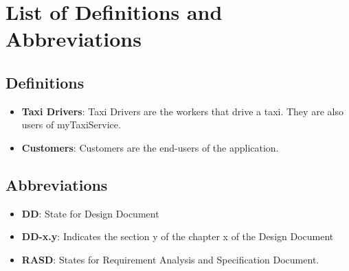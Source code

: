 \documentclass[../../../../testPlan.tex]{subfiles}
\begin{document}
	\section{List of Definitions and Abbreviations}

		\subsection{Definitions}
			\begin{itemize}
				\item \textbf{Taxi Drivers}: Taxi Drivers are the workers that drive a taxi. They are also users of myTaxiService.
				\item \textbf{Customers}: Customers are the end-users of the application.
			\end{itemize}

		\subsection{Abbreviations}
			\begin{itemize}
				\item \textbf{DD}: State for Design Document
				\item \textbf{DD-x.y}: Indicates the section y of the chapter x of the Design Document
				\item \textbf{RASD}: States for Requirement Analysis and Specification Document.
			\end{itemize}
\end{document}
